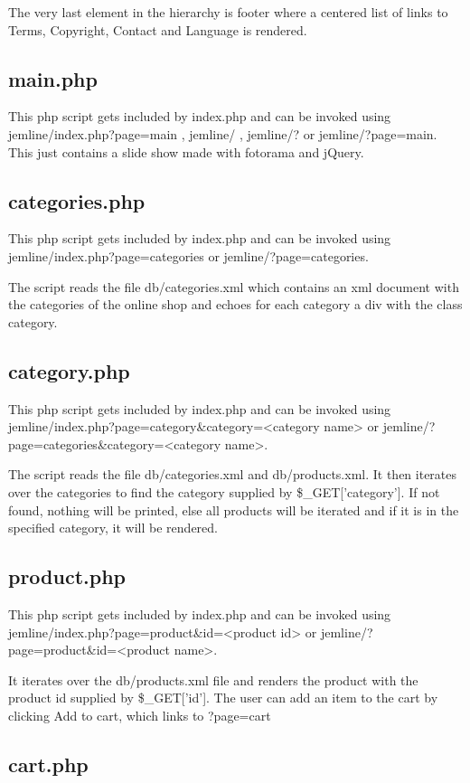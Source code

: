 \documentclass{scrartcl}
\begin{document}
The very last element in the hierarchy is footer where a centered list of links to Terms, Copyright, Contact and Language is rendered. 

\subsection{main.php}
This php script gets included by index.php and can be invoked using jemline/index.php?page=main , jemline/ , jemline/? or jemline/?page=main.
This just contains a slide show made with fotorama and jQuery.

\subsection{categories.php}
This php script gets included by index.php and can be invoked using jemline/index.php?page=categories 
or jemline/?page=categories.

The script reads the file db/categories.xml which contains an xml document with the categories of the online shop and echoes for each category a div with the class category.

\subsection{category.php}
This php script gets included by index.php and can be invoked using jemline/index.php?page=category\&category=\textless category name\textgreater 
or jemline/?page=categories\&category=\textless category name\textgreater.

The script reads the file db/categories.xml and db/products.xml. It then iterates over the categories to find the category supplied by \$\_GET['category']. If not found, nothing will be printed, else all products will be iterated and if it is in the specified category, it will be rendered.

\subsection{product.php}
This php script gets included by index.php and can be invoked using jemline/index.php?page=product\&id=\textless product id\textgreater 
or jemline/?page=product\&id=\textless product name\textgreater .

It iterates over the db/products.xml file and renders the product with the product id supplied by \$\_GET['id']. 
The user can add an item to the cart by clicking Add to cart, which links to ?page=cart
\subsection{cart.php}
\end{document}
